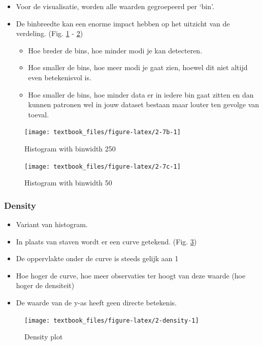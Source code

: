 \documentclass[]{tufte-book}
\providecommand{\tightlist}{%
  \setlength{\itemsep}{0pt}\setlength{\parskip}{0pt}}
\begin{document}
\begin{itemize}
\tightlist
\item
  Voor de visualisatie, worden alle waarden gegroepeerd per `bin'.
\item
  De binbreedte kan een enorme impact hebben op het uitzicht van de verdeling. (Fig. \ref{fig:2-7b} - \ref{fig:2-7c})

  \begin{itemize}
  \tightlist
  \item
    Hoe breder de bins, hoe minder modi je kan detecteren.
  \item
    Hoe smaller de bins, hoe meer modi je gaat zien, hoewel dit niet altijd even betekenisvol is.
  \item
    Hoe smaller de bins, hoe minder data er in iedere bin gaat zitten en dan kunnen patronen wel in jouw dataset bestaan maar louter ten gevolge van toeval.
  \end{itemize}
\end{itemize}

\begin{figure}
\texttt{[image: textbook\_files/figure-latex/2-7b-1]} \caption[Histogram with binwidth 250]{Histogram with binwidth 250}\label{fig:2-7b}
\end{figure}

\begin{figure}
\texttt{[image: textbook\_files/figure-latex/2-7c-1]} \caption[Histogram with binwidth 50]{Histogram with binwidth 50}\label{fig:2-7c}
\end{figure}

\hypertarget{density}{%
\subsubsection{Density}\label{density}}

\begin{itemize}
\tightlist
\item
  Variant van histogram.
\item
  In plaats van staven wordt er een curve getekend. (Fig. \ref{fig:2-density})
\item
  De oppervlakte onder de curve is steeds gelijk aan 1
\item
  Hoe hoger de curve, hoe meer observaties ter hoogt van deze waarde (hoe hoger de densiteit)
\item
  De waarde van de y-as heeft geen directe betekenis.
\end{itemize}

\begin{figure}
\texttt{[image: textbook\_files/figure-latex/2-density-1]} \caption[Density plot]{Density plot}\label{fig:2-density}
\end{figure}
\end{document}
